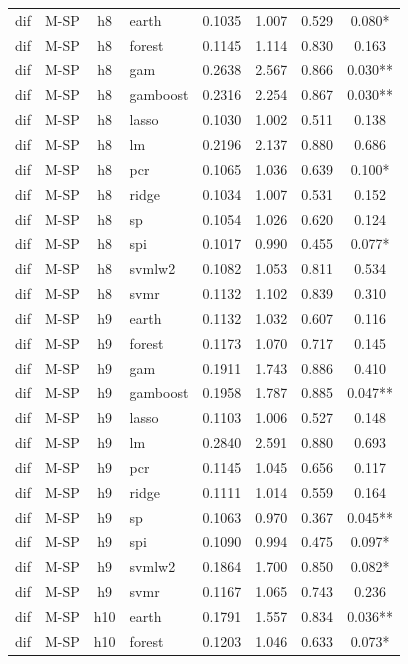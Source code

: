 \begin{ThreePartTable}
\begin{longtable}[t]{llclcccc}
\addlinespace
dif & M-SP & h8 & earth & 0.1035 & 1.007 & 0.529 & 0.080*\\
dif & M-SP & h8 & forest & 0.1145 & 1.114 & 0.830 & 0.163\\
dif & M-SP & h8 & gam & 0.2638 & 2.567 & 0.866 & 0.030**\\
dif & M-SP & h8 & gamboost & 0.2316 & 2.254 & 0.867 & 0.030**\\
dif & M-SP & h8 & lasso & 0.1030 & 1.002 & 0.511 & 0.138\\
dif & M-SP & h8 & lm & 0.2196 & 2.137 & 0.880 & 0.686\\
dif & M-SP & h8 & pcr & 0.1065 & 1.036 & 0.639 & 0.100*\\
dif & M-SP & h8 & ridge & 0.1034 & 1.007 & 0.531 & 0.152\\
dif & M-SP & h8 & sp & 0.1054 & 1.026 & 0.620 & 0.124\\
dif & M-SP & h8 & spi & 0.1017 & 0.990 & 0.455 & 0.077*\\
dif & M-SP & h8 & svmlw2 & 0.1082 & 1.053 & 0.811 & 0.534\\
dif & M-SP & h8 & svmr & 0.1132 & 1.102 & 0.839 & 0.310\\
\addlinespace
dif & M-SP & h9 & earth & 0.1132 & 1.032 & 0.607 & 0.116\\
dif & M-SP & h9 & forest & 0.1173 & 1.070 & 0.717 & 0.145\\
dif & M-SP & h9 & gam & 0.1911 & 1.743 & 0.886 & 0.410\\
dif & M-SP & h9 & gamboost & 0.1958 & 1.787 & 0.885 & 0.047**\\
dif & M-SP & h9 & lasso & 0.1103 & 1.006 & 0.527 & 0.148\\
dif & M-SP & h9 & lm & 0.2840 & 2.591 & 0.880 & 0.693\\
dif & M-SP & h9 & pcr & 0.1145 & 1.045 & 0.656 & 0.117\\
dif & M-SP & h9 & ridge & 0.1111 & 1.014 & 0.559 & 0.164\\
dif & M-SP & h9 & sp & 0.1063 & 0.970 & 0.367 & 0.045**\\
dif & M-SP & h9 & spi & 0.1090 & 0.994 & 0.475 & 0.097*\\
dif & M-SP & h9 & svmlw2 & 0.1864 & 1.700 & 0.850 & 0.082*\\
dif & M-SP & h9 & svmr & 0.1167 & 1.065 & 0.743 & 0.236\\
\addlinespace
dif & M-SP & h10 & earth & 0.1791 & 1.557 & 0.834 & 0.036**\\
dif & M-SP & h10 & forest & 0.1203 & 1.046 & 0.633 & 0.073*\\

\end{longtable}
\end{ThreePartTable}
